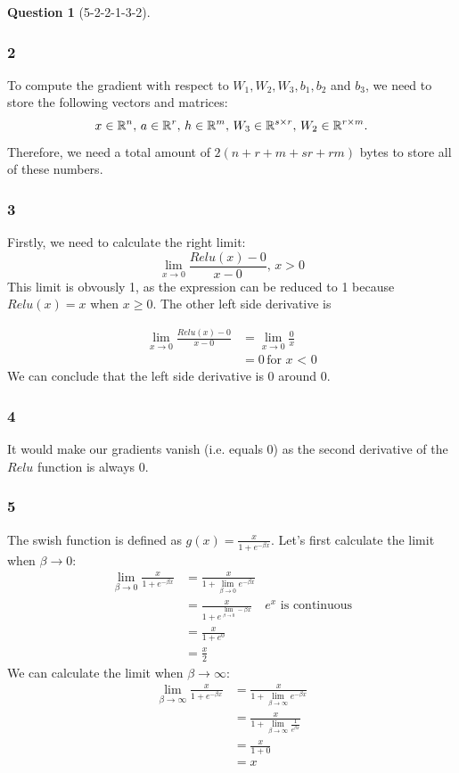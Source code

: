 \documentclass[12pt]{article}
\theoremstyle{definition}
\newtheorem{exercise}{Question}%
\begin{document}
\begin{exercise}[5-2-2-1-3-2]
{\subsubsection*{2}
  To compute the gradient with respect to $W_{1}, W_{2}, W_{3}, b_{1}, b_{2}$ and
  $b_{3}$, we need to store the following vectors and matrices:
  \begin{equation*}
    x \in \mathbb{R}^{n}, \, a \in \mathbb{R}^{r}, \, h \in \mathbb{R}^{m}, \,W_{3} \in \mathbb{R}^{s \times r}, \, W_{2} \in \mathbb{R}^{r \times m}.
  \end{equation*}Therefore, we need a total amount of $2(n+r+m+sr+rm)$ bytes to
  store all of these numbers.
\subsubsection*{3}
Firstly, we need to calculate the right limit:
\begin{equation*}
  \lim_{x\to0} \frac{ Relu(x)-0 }{x-0},\, x > 0
\end{equation*}This limit is obvously 1, as the expression can be reduced to 1
because $Relu(x) = x$ when $x\geq0$.
The other left side derivative is

\begin{align*}
  \lim_{x\to0} \frac{ Relu(x)-0 }{x-0} &= \lim_{x\to0} \frac{0}{x} \\
  &= 0 \, \text{for $x$ < 0}
\end{align*}We can conclude that the left side derivative is 0 around 0.

}
\subsubsection*{4}It would make our gradients vanish (i.e. equals 0) as the second derivative of
the $Relu$ function is always $0$.
\subsubsection{5}
The swish function is defined as $g(x) = \frac{x}{1+e^{-\beta x}}$. Let's first
calculate the limit when $\beta \to 0$:
\begin{align*}
  \lim_{\beta \to 0} \frac{x}{1+e^{-\beta x}} &= \frac{x}{1+\lim_{\beta \to 0} e^{-\beta x}}\\
  &=  \frac{x}{1+ e^{\lim_{\beta \to 0}-\beta x}} \quad \text{$e^{x}$ is continuous}\\
  &=  \frac{x}{1+ e^{0}}\\
  &=  \frac{x}{2}
\end{align*}
We can calculate the limit when $\beta \to \infty$:
\begin{align*}
  \lim_{\beta \to \infty} \frac{x}{1+e^{-\beta x}} &= \frac{x}{1+\lim_{\beta \to \infty} e^{-\beta x}}\\
  &= \frac{x}{1+\lim_{\beta \to \infty} \frac{1}{e^{\beta x}}}\\
  &=  \frac{x}{1+ 0}\\
  &=  x
\end{align*}

\end{exercise}
\end{document}
